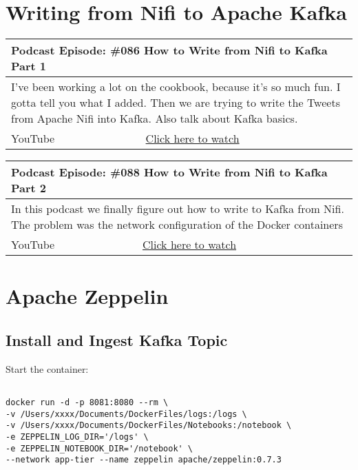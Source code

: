 \documentclass[12pt, numbers=noenddot]{scrreprt} %
\begin{document}
\chapter{Writing from Nifi to Apache Kafka}

\begin{table}[h]
\begin{tabular}{ll}
\hline
\multicolumn{2}{l}{\textbf{Podcast Episode:} \#086 How to Write from Nifi to Kafka Part 1} \\ \hline
\multicolumn{2}{p{15cm}}{I've been working a lot on the cookbook, because it's so much fun. I gotta tell you what I added.  Then we are trying to write the Tweets from Apache Nifi into Kafka. Also talk about Kafka basics.}         \\ \hline
\multicolumn{1}{l|}{YouTube}   & \href{https://youtu.be/F7Y-ygnyJMg}{Click here to watch}   \\  \hline
\end{tabular}
\end{table}

\begin{table}[h]
\begin{tabular}{ll}
\hline
\multicolumn{2}{l}{\textbf{Podcast Episode:} \#088 How to Write from Nifi to Kafka Part 2} \\ \hline
\multicolumn{2}{p{15cm}}{In this podcast we finally figure out how to write to Kafka from Nifi. The problem was the network configuration of the Docker containers}         \\ \hline
\multicolumn{1}{l|}{YouTube}   & \href{https://youtu.be/pJbRnBQmoCs}{Click here to watch}   \\ \hline
\end{tabular}
\end{table}


\chapter{Apache Zeppelin}

\section{Install and Ingest Kafka Topic}

Start the container:
\begin{lstlisting}

docker run -d -p 8081:8080 --rm \
-v /Users/xxxx/Documents/DockerFiles/logs:/logs \ 
-v /Users/xxxx/Documents/DockerFiles/Notebooks:/notebook \
-e ZEPPELIN_LOG_DIR='/logs' \
-e ZEPPELIN_NOTEBOOK_DIR='/notebook' \
--network app-tier --name zeppelin apache/zeppelin:0.7.3
\end{lstlisting}
\end{document}
